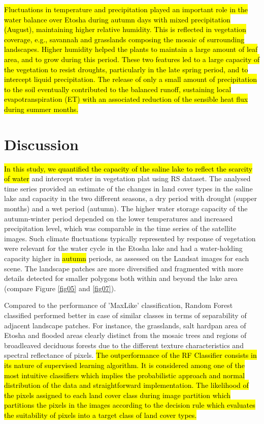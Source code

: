 \documentclass[climate,article,submit,pdftex,moreauthors]{Definitions/mdpi}
\begin{document}
\hl{Fluctuations in temperature and precipitation played an important role in the water balance over Etosha during autumn days with mixed precipitation (August), maintaining higher relative humidity. This is reflected in vegetation coverage, e.g., savannah and grasslands composing the mosaic of surrounding landscapes. Higher humidity helped the plants to maintain a large amount of leaf area, and to grow during this period. These two features led to a large capacity of the vegetation to resist droughts, particularly in the late spring period, and to intercept liquid precipitation. The release of only a small amount of precipitation to the soil eventually contributed to the balanced runoff, sustaining local evapotranspiration (ET) with an associated reduction of the sensible heat flux during summer months.}

\section{Discussion}

\hl{In this study, we quantified the capacity of the saline lake to reflect the scarcity of water} and intercept water in vegetation plat using RS dataset. The analysed time series provided an estimate of the changes in land cover types in the saline lake and capacity in the two different seasons, a dry period with drought (supper months) and a wet period (autumn). The higher water storage capacity of the autumn-winter period depended on the lower temperatures and increased precipitation level, which was comparable in the time series of the satellite images. Such climate fluctuations typically represented by response of vegetation were relevant for the water cycle in the Etosha lake and had a water-holding capacity higher in \hl{autumn} periods, as assessed on the Landsat images for each scene. The landscape patches are more diversified and fragmented with more details detected for smaller polygons both within and beyond the lake area (compare Figure \ref{fig05} and \ref{fig07}). 

Compared to the performance of 'MaxLike' classification, Random Forest classified performed better in case of similar classes in terms of separability of adjacent landscape patches. For instance, the grasslands, salt hardpan area of Etosha and flooded areas clearly distinct from the mosaic trees and regions of broadleaved deciduous forests due to the different texture characteristics and spectral reflectance of pixels. \hl{The outperformance of the RF Classifier consists in its nature of supervised learning algorithm. It is considered among one of the most intuitive classifiers which implies the probabilistic approach and normal distribution of the data and straightforward implementation. The likelihood of the pixels assigned to each land cover class during image partition which partitions the pixels in the images according to the decision rule which evaluates the suitability of pixels into a target class of land cover types.}
\end{document}
